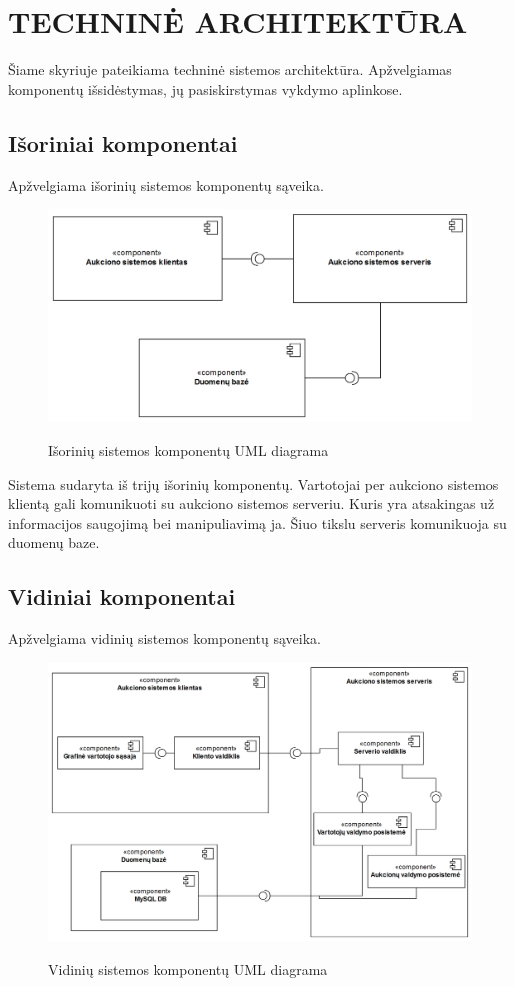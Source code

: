 \documentclass{VUMIFPSkursinis}
\begin{document}
	\section{TECHNINĖ ARCHITEKTŪRA}
	Šiame skyriuje pateikiama techninė sistemos architektūra. Apžvelgiamas komponentų išsidėstymas, jų pasiskirstymas vykdymo aplinkose.
	\subsection{Išoriniai komponentai}
	Apžvelgiama išorinių sistemos komponentų sąveika.
	\begin{figure}[H]
		\centering
		\includegraphics[width=\linewidth]{img/umlComponentDiagramExternal.png}
		\label{fig:aukckoreg}
		\caption{Išorinių sistemos komponentų UML diagrama}
	\end{figure}

	Sistema sudaryta iš trijų išorinių komponentų. Vartotojai per aukciono sistemos klientą gali komunikuoti su aukciono sistemos serveriu. Kuris yra atsakingas už informacijos saugojimą bei manipuliavimą ja. Šiuo tikslu serveris komunikuoja su duomenų baze.

	\newpage

	\subsection{Vidiniai komponentai}
	Apžvelgiama vidinių sistemos komponentų sąveika.
	\begin{figure}[H]
		\centering
		\includegraphics[width=\linewidth]{img/umlComponentDiagram.png}
		\label{fig:aukckoreg}
		\caption{Vidinių sistemos komponentų UML diagrama}
	\end{figure}
\end{document}
